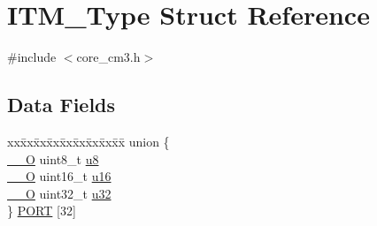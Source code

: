 \hypertarget{structITM__Type}{}\section{I\+T\+M\+\_\+\+Type Struct Reference}
\label{structITM__Type}


{\ttfamily \#include $<$core\+\_\+cm3.\+h$>$}

\subsection*{Data Fields}
\begin{DoxyCompactItemize}
\item 
\begin{tabbing}
xx\=xx\=xx\=xx\=xx\=xx\=xx\=xx\=xx\=\kill
union \{\\
\>\hyperlink{LPC17xx_8h_a7e25d9380f9ef903923964322e71f2f6}{\_\_O} uint8\_t \hyperlink{structITM__Type_abea77b06775d325e5f6f46203f582433}{u8}\\
\>\hyperlink{LPC17xx_8h_a7e25d9380f9ef903923964322e71f2f6}{\_\_O} uint16\_t \hyperlink{structITM__Type_a12aa4eb4d9dcb589a5d953c836f4e8f4}{u16}\\
\>\hyperlink{LPC17xx_8h_a7e25d9380f9ef903923964322e71f2f6}{\_\_O} uint32\_t \hyperlink{structITM__Type_a6882fa5af67ef5c5dfb433b3b68939df}{u32}\\
\} \hyperlink{structITM__Type_ab6890c514a53655eef5289350bf2900a}{PORT} \mbox{[}32\mbox{]}\\


\end{tabbing}
\end{DoxyCompactItemize}
